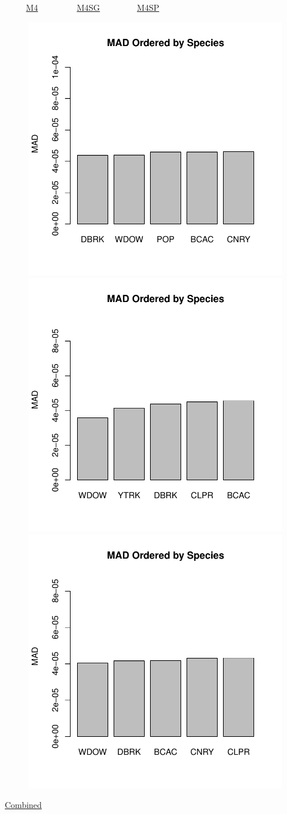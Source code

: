 \documentclass[ xcolor = pdftex, dvipsnames, table ]{beamer}
\begin{document}
\begin{frame}{$~~~~~~~~~~$ \href{https://github.com/gasduster99/sppComp/tree/master/sscRuns/25019781982M4}{M4} $~~~~~~~~~~~~~~~~~~$ \href{https://github.com/gasduster99/sppComp/tree/master/sscRuns/25019781982M4IGSG}{M4SG} $~~~~~~~~~~~~~~~~~$ \href{https://github.com/gasduster99/sppComp/tree/master/sscRuns/25019781982M4IGSP}{M4SP} }
        \begin{figure}[ht!]
        \centering
        \hspace*{-1cm}
        \includegraphics[width=.4\textwidth]{../sscRuns/25019781982M4/sppHeadMad68.pdf}
        \includegraphics[width=.4\textwidth]{../sscRuns/25019781982M4IGSG/sppHeadMad68.pdf}
        \includegraphics[width=.4\textwidth]{../sscRuns/25019781982M4IGSP/sppHeadMad68.pdf}
        \end{figure}
	\vspace{-1cm}
	\begin{center}
	\Large
	\href{https://github.com/gasduster99/sppComp/tree/master/try1/postSSC/25019781982M4IGSPSG}{Combined}
	\end{center}
\end{frame}
\end{document}
